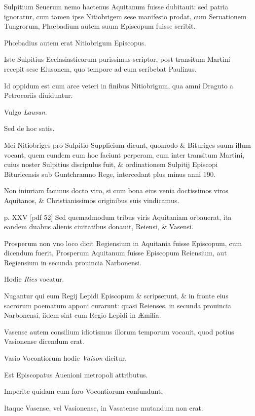 \begin{parnumbers}
Sulpitium Seuerum
nemo hactenus Aquitanum fuisse dubitauit: sed patria ignoratur,
cum tamen ipse Nitiobrigem sese manifesto prodat, cum Seruationem
Tungrorum, Phœbadium autem suum Episcopum fuisse scribit.

Phœbadius autem erat Nitiobrigum Episcopus.

Iste Sulpitius
Ecclasiasticorum purissimus scriptor, post transitum Martini recepit
sese Elusonem, quo tempore ad eum scribebat Paulinus.

Id oppidum est cum arce veteri in finibus Nitiobrigum, qua amni Draguto
a Petrocoriis diuiduntur.

Vulgo \textit{Lausun}.

Sed de hoc satis.

Mei
Nitiobriges pro Sulpitio Supplicium dicunt, quomodo \& Bituriges
suum illum vocant, quem eundem cum hoc faciunt perperam,
cum inter transitum Martini, cuius noster Sulpitius discipulus fuit,
\& ordinationem Sulpitij Episcopi Bituricensis sub Guntchramno
Rege, intercedant plus minus anni 190.

Non iniuriam facimus
docto viro, si cum bona eius venia doctissimos viros Aquitanos,
\& Christianissimos originibus suis vindicamus.

\clearpage
p. XXV [pdf 52]
Sed quemadmodum tribus viris Aquitaniam orbauerat, ita eandem duabus
alienis ciuitatibus donauit, Reiensi, \& Vasensi.

Prosperum non vno
loco dicit Regiensium in Aquitania fuisse Episcopum, cum dicendum
fuerit, Prosperum Aquitanum fuisse Episcopum Reiensium,
aut Regiensium in secunda prouincia Narbonensi.

Hodie \textit{Ries} vocatur.

Nugantur qui eum Regij Lepidi Episcopum \& scripserunt,
\& in fronte eius sacrorum poematum apponi curarunt: quasi Reienses,
in secunda prouincia Narbonensi, iidem sint cum Regio Lepidi
in Æmilia.

Vasense autem consilium idiotismus illorum temporum
vocauit, quod potius Vasionense dicendum erat.

Vasio Vocontiorum hodie \textit{Vaison} dicitur.

Est Episcopatus Auenioni metropoli
attributus.

Imperite quidam cum foro Vocontiorum confundunt.

Itaque Vasense, vel Vasionense, in Vasatense mutandum non
erat.


\end{parnumbers}
